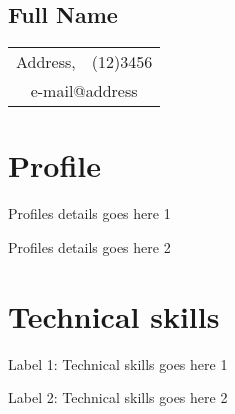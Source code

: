 \documentclass[a4paper,11pt]{article}
\begin{document}
\begin{comment}
This is cover letter field.
\end{comment}


\begin{center}
  \section*{Full Name}
  \begin{tabular}{l r}
    Address, & (12)3456 \\
    \multicolumn{2}{c}{e-mail@address} \\
  \end{tabular}
\end{center}

\begin{comment}
\begin{tabular}{l l}
  Mobile:  & (12)3456 \\
  E-mail:  & e-mail address \\
  Address: & 111, road, state \\
  \multicolumn{2}{l}{One column information} \\
\end{tabular}
\end{comment}

\section*{Profile}
\begin{itemize*}
    \setlength\itemsep{0.4em}
  \item Profiles details goes here 1
  \item Profiles details goes here 2
\end{itemize*}

\section*{Technical skills}
\begin{description*}
    \setlength\itemindent{0cm}
    \setlength\itemsep{0.4em}
  \item [Label 1:] Technical skills goes here 1
  \item [Label 2:] Technical skills goes here 2
\end{description*}
\end{document}
